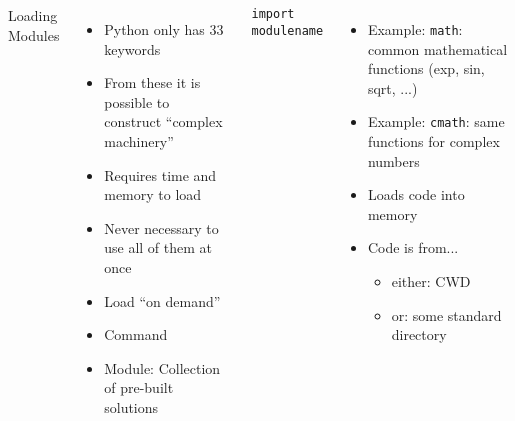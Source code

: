 \begin{frame}[fragile]
%
\begin{columns}
\begin{Large}
Loading Modules
\vspace{6pt}
\end{Large}
\begin{itemize}
\item Python only has 33 keywords
\item From these it is possible to construct \enquote{complex machinery}
\item Requires time and memory to load
\item Never necessary to use all of them at once
\item[\Thus] Load \enquote{on demand}
\item[\Thus] Command 
\item Module: Collection of pre-built solutions
\end{itemize}
%
\begin{codebox}
\begin{verbatim}
import modulename
\end{verbatim}
\end{codebox}
\begin{itemize}
\item Example: \texttt{math}: common mathematical functions (exp, sin, sqrt, ...)
\item Example: \texttt{cmath}: same functions for complex numbers
\item Loads code into memory
\item Code is from...
	\begin{itemize}
	\item either: CWD
	\item or: some standard directory
	\end{itemize}
\end{itemize}
\end{columns}
%
\end{frame}


